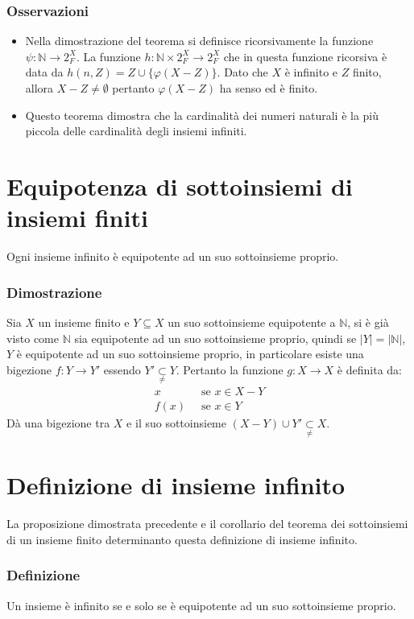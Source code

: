\subsubsection{Osservazioni}
\begin{itemize}
\item Nella dimostrazione del teorema si definisce ricorsivamente la funzione $\psi:\mathbb{N}\rightarrow 2^X_F$. La funzione $h:\mathbb{N}\times 2^X_F\rightarrow 
2^X_F$ che in questa funzione ricorsiva \`e data da $h(n, Z)=Z\cup\{\varphi(X-Z)\}$. Dato che $X$ \`e infinito e $Z$ finito, allora $X-Z\neq\emptyset$ pertanto 
$\varphi(X-Z)$ ha senso ed \`e finito. 
\item Questo teorema dimostra che la cardinalit\`a dei numeri naturali \`e la pi\`u piccola delle cardinalit\`a degli insiemi infiniti.
\end{itemize}
\section{Equipotenza di sottoinsiemi di insiemi finiti}
Ogni insieme infinito \`e equipotente ad un suo sottoinsieme proprio.
\subsubsection{Dimostrazione}
Sia $X$ un insieme finito e $Y\subseteq X$ un suo sottoinsieme equipotente a $\mathbb{N}$, si \`e gi\`a visto come $\mathbb{N}$ sia equipotente ad un suo 
sottoinsieme proprio, quindi se $|Y|=|\mathbb{N}|$, $Y$ \`e equipotente ad un suo sottoinsieme proprio, in particolare esiste una bigezione $f:Y\rightarrow Y'$
essendo $Y'\underset{\neq}{\subset}Y$. Pertanto la funzione $g:X\rightarrow X$ \`e definita da:
\begin{align*}
x\;\;&\text{se }x\in X-Y\\
f(x)\;\;&\text{se }x\in Y
\end{align*}
D\`a una bigezione tra $X$ e il suo sottoinsieme $(X-Y)\cup Y'\underset{\neq}{\subset}X$.
\section{Definizione di insieme infinito}
La proposizione dimostrata precedente e il corollario del teorema dei sottoinsiemi di un insieme finito determinanto questa definizione di insieme infinito.
\subsubsection{Definizione}
Un insieme \`e infinito se e solo se \`e equipotente ad un suo sottoinsieme proprio.